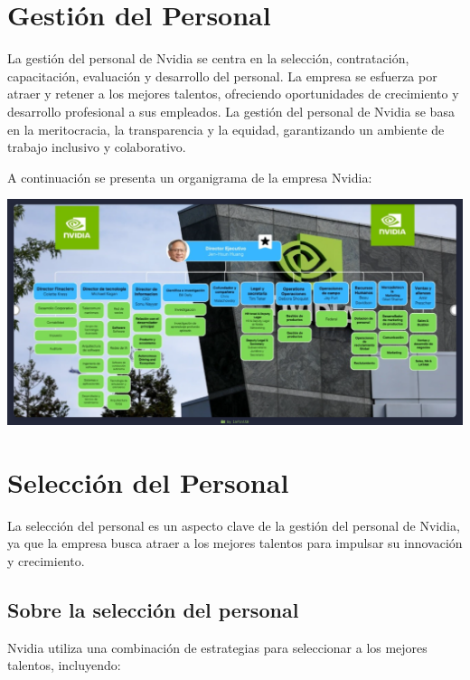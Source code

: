 \documentclass{article}
\begin{document}
\newpage
\section{Gestión del Personal}

La gestión del personal de Nvidia se centra en la selección, contratación, capacitación, evaluación y desarrollo del personal. La empresa se esfuerza por atraer y retener a los mejores talentos, ofreciendo oportunidades de crecimiento y desarrollo profesional a sus empleados. La gestión del personal de Nvidia se basa en la meritocracia, la transparencia y la equidad, garantizando un ambiente de trabajo inclusivo y colaborativo.

A continuación se presenta un organigrama de la empresa Nvidia:

\begin{center}
  \includegraphics[width=15cm]{assets/forest.png}
\end{center}

\section{Selección del Personal}

La selección del personal es un aspecto clave de la gestión del personal de Nvidia, ya que la empresa busca atraer a los mejores talentos para impulsar su innovación y crecimiento.

\subsection{Sobre la selección del personal}

Nvidia utiliza una combinación de estrategias para seleccionar a los mejores talentos, incluyendo:
\end{document}
